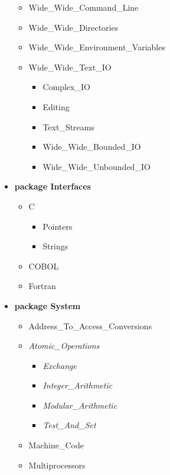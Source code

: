 \documentclass[english]{article}
\begin{document}
\begin{scriptsize}
\begin{multicols*}{5}
\begin{itemize}[leftmargin=0mm]
\begin{itemize}[leftmargin=5mm]
\begin{itemize}[leftmargin=5mm]
\begin{itemize}[leftmargin=5mm]
            \end{itemize}
         \end{itemize}
      \item[] Wide\_Wide\_Command\_Line
      \item[] Wide\_Wide\_Directories
      \item[] Wide\_Wide\_Environment\_Variables
      \item[] Wide\_Wide\_Text\_IO
         \begin{itemize}[leftmargin=5mm]
            \item[] Complex\_IO
            \item[] Editing
            \item[] Text\_Streams
            \item[] Wide\_Wide\_Bounded\_IO
            \item[] Wide\_Wide\_Unbounded\_IO
         \end{itemize}
   \end{itemize}
\item[] \textbf{package Interfaces}
   \begin{itemize}[leftmargin=5mm]
      \item[] C
         \begin{itemize}[leftmargin=5mm]
            \item[] Pointers
            \item[] Strings
         \end{itemize}
      \item[] COBOL
      \item[] Fortran
   \end{itemize}
\item[] \textbf{package System}
   \begin{itemize}[leftmargin=5mm]
      \item[] Address\_To\_Access\_Conversions
      \item[] \textit{Atomic\_Operations}
         \begin{itemize}[leftmargin=5mm]
            \item[] \textit{Exchange}
            \item[] \textit{Integer\_Arithmetic}
            \item[] \textit{Modular\_Arithmetic}
            \item[] \textit{Test\_And\_Set}
         \end{itemize}
      \item[] Machine\_Code
      \item[] Multiprocessors

\end{itemize}
\end{itemize}
\end{multicols*}
\end{scriptsize}
\end{document}
